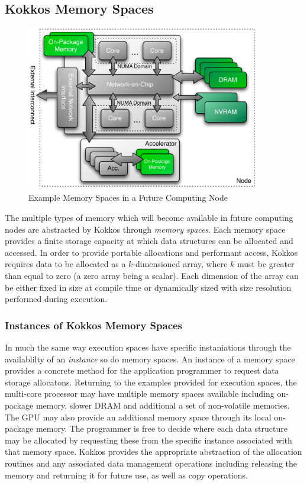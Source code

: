 \subsection{Kokkos Memory Spaces}

\begin{figure}
\begin{center}
\includegraphics[width=4in]{figures/kokkos-memory-space.pdf}
\caption{Example Memory Spaces in a Future Computing Node}
\label{fig:kokkos_memory_spaces}
\end{center}
\end{figure}

The multiple types of memory which will become available in future
computing nodes are abstracted by Kokkos through {\em memory
spaces}. Each memory space provides a finite storage capacity
at which data structures can be allocated and accessed. In
order to provide portable allocations and performant access,
Kokkos requires data to be allocated as a $k$-dimensioned array,
where $k$ must be greater than equal to zero (a zero array being
a scalar). Each dimension of the array can be either fixed in
size at compile time or dynamically sized with size resolution
performed during execution.

\subsubsection{Instances of Kokkos Memory Spaces}

In much the same way execution spaces have specific instaniations through
the availablilty of an {\em instance} so do memory spaces. An instance
of a memory space provides a concrete method for the
application programmer to request data storage allocatons. Returning
to the examples provided for execution spaces, the multi-core
processor may have multiple memory spaces available including
on-package memory, slower DRAM and additional a set of non-volatile
memories. The GPU may also provide an additional memory space
through its local on-package memory. The programmer is free
to decide where each data structure may be allocated by requesting
these from the specific instance associated with that memory space.
Kokkos provides the appropriate abstraction of the allocation
routines and any associated data management operations including
releasing the memory and returning it for future use, as well as
copy operations.

